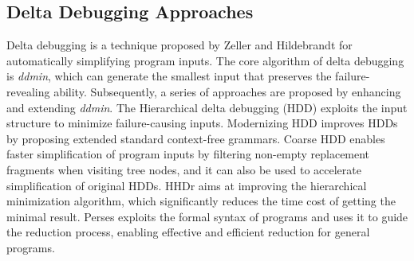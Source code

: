 \subsection{Delta Debugging Approaches}

Delta debugging \cite{Zeller2002} is a technique proposed by Zeller and Hildebrandt for automatically simplifying program inputs. 
The core algorithm of delta debugging is \emph{ddmin}, which can generate the smallest input that preserves the failure-revealing ability.
Subsequently, a series of approaches are proposed by enhancing and extending \emph{ddmin}. 
The Hierarchical delta debugging (HDD) \cite{Misherghi2016} exploits the input structure to minimize failure-causing inputs. 
Modernizing HDD \cite{hodovan2016} improves HDDs by proposing extended standard context-free grammars. 
Coarse HDD \cite{Hod2017} enables faster simplification of program inputs by filtering non-empty replacement fragments when visiting tree nodes, and it can also be used to accelerate simplification of original HDDs. 
HHDr \cite{kiss2018hddr} aims at improving the hierarchical minimization algorithm, which significantly reduces the time cost of getting the minimal result.
Perses \cite{Sun2018} exploits the formal syntax of programs and uses it to guide the reduction process, enabling effective and efficient reduction for general programs.

